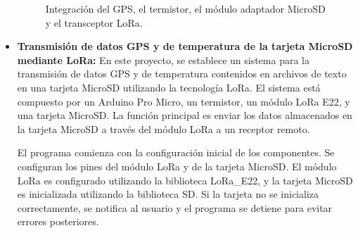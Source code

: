 \begin{itemize}
\begin{figure}[H]
    \centering
    \quad
    \caption{Integración del GPS, el termistor, el módulo adaptador MicroSD y el transceptor LoRa.}
    \label{fig:lora-memoria-img}
\end{figure}

\item \textbf{Transmisión de datos GPS y de temperatura de la tarjeta MicroSD mediante LoRa:} 
En este proyecto, se establece un sistema para la transmisión de datos GPS y de temperatura contenidos en archivos de texto en una tarjeta MicroSD utilizando la tecnología LoRa. El sistema está compuesto por un Arduino Pro Micro, un termistor, un módulo LoRa E22, y una tarjeta MicroSD. La función principal es enviar los datos almacenados en la tarjeta MicroSD a través del módulo LoRa a un receptor remoto.

El programa comienza con la configuración inicial de los componentes. Se configuran los pines del módulo LoRa y de la tarjeta MicroSD. El módulo LoRa es configurado utilizando la biblioteca LoRa\_E22, y la tarjeta MicroSD es inicializada utilizando la biblioteca SD. Si la tarjeta no se inicializa correctamente, se notifica al usuario y el programa se detiene para evitar errores posteriores.


\end{itemize}
